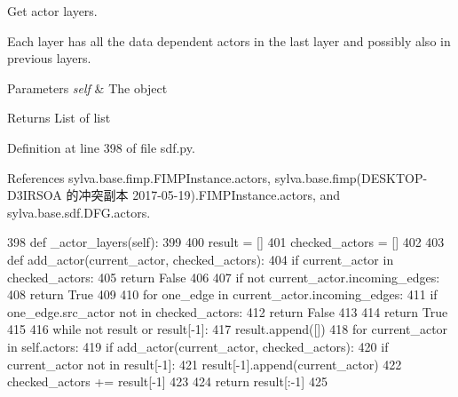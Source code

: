 Get actor layers. 

Each layer has all the data dependent actors in the last layer and possibly also in previous layers.


\begin{DoxyParams}{Parameters}
{\em self} & The object\\
\hline
\end{DoxyParams}
\begin{DoxyReturn}{Returns}
List of list 
\end{DoxyReturn}


Definition at line 398 of file sdf.\+py.



References sylva.\+base.\+fimp.\+F\+I\+M\+P\+Instance.\+actors, sylva.\+base.\+fimp(\+D\+E\+S\+K\+T\+O\+P-\/\+D3\+I\+R\+S\+O\+A 的冲突副本 2017-\/05-\/19).\+F\+I\+M\+P\+Instance.\+actors, and sylva.\+base.\+sdf.\+D\+F\+G.\+actors.


\begin{DoxyCode}
398     \textcolor{keyword}{def }\_actor\_layers(self):
399 
400         result = []
401         checked\_actors = []
402 
403         \textcolor{keyword}{def }add\_actor(current\_actor, checked\_actors):
404             \textcolor{keywordflow}{if} current\_actor \textcolor{keywordflow}{in} checked\_actors:
405                 \textcolor{keywordflow}{return} \textcolor{keyword}{False}
406 
407             \textcolor{keywordflow}{if} \textcolor{keywordflow}{not} current\_actor.incoming\_edges:
408                 \textcolor{keywordflow}{return} \textcolor{keyword}{True}
409 
410             \textcolor{keywordflow}{for} one\_edge \textcolor{keywordflow}{in} current\_actor.incoming\_edges:
411                 \textcolor{keywordflow}{if} one\_edge.src\_actor \textcolor{keywordflow}{not} \textcolor{keywordflow}{in} checked\_actors:
412                     \textcolor{keywordflow}{return} \textcolor{keyword}{False}
413 
414             \textcolor{keywordflow}{return} \textcolor{keyword}{True}
415 
416         \textcolor{keywordflow}{while} \textcolor{keywordflow}{not} result \textcolor{keywordflow}{or} result[-1]:
417             result.append([])
418             \textcolor{keywordflow}{for} current\_actor \textcolor{keywordflow}{in} self.actors:
419                 \textcolor{keywordflow}{if} add\_actor(current\_actor, checked\_actors):
420                     \textcolor{keywordflow}{if} current\_actor \textcolor{keywordflow}{not} \textcolor{keywordflow}{in} result[-1]:
421                         result[-1].append(current\_actor)
422             checked\_actors += result[-1]
423 
424         \textcolor{keywordflow}{return} result[:-1]
425 
\end{DoxyCode}
\mbox{\label{classsylva_1_1base_1_1sdf_1_1_d_f_g_a80ccaab79271be0d90347c079a666719}} 
